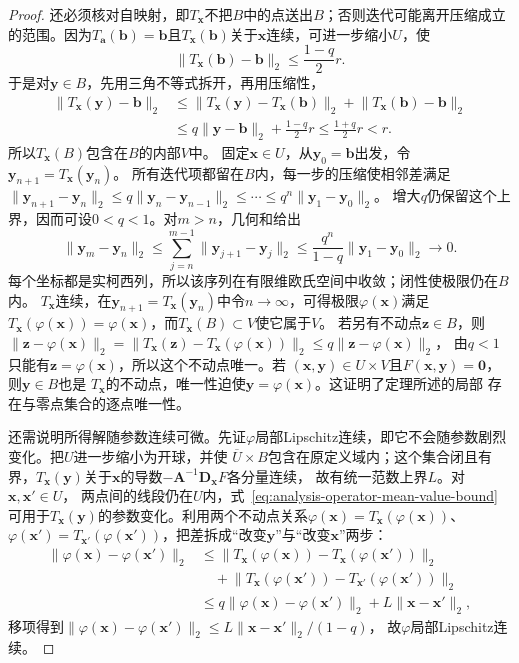 \begin{proof}
还必须核对自映射，即$T_{\bm x}$不把$B$中的点送出$B$；否则迭代可能离开压缩成立的范围。因为$T_{\bm{a}}(\bm{b})=\bm{b}$且$T_{\bm{x}}(\bm{b})$关于$\bm{x}$连续，可进一步缩小$U$，使
\[
 \lVert T_{\bm{x}}(\bm{b})-\bm{b}\rVert_2\leq\frac{1-q}{2}r.
\]
于是对$\bm{y}\in B$，先用三角不等式拆开，再用压缩性，
\[
 \begin{aligned}
  \lVert T_{\bm{x}}(\bm{y})-\bm{b}\rVert_2
  &\leq
  \lVert T_{\bm{x}}(\bm{y})-T_{\bm{x}}(\bm{b})\rVert_2+\lVert T_{\bm{x}}(\bm{b})-\bm{b}\rVert_2\\
  &\leq
  q\lVert\bm{y}-\bm{b}\rVert_2+\frac{1-q}{2}r
  \leq
  \frac{1+q}{2}r
  <r.
 \end{aligned}
\]
所以$T_{\bm{x}}(B)$包含在$B$的内部$V$中。
固定$\bm x\in U$，从$\bm y_0=\bm b$出发，令$\bm y_{n+1}=T_{\bm x}(\bm y_n)$。
所有迭代项都留在$B$内，每一步的压缩使相邻差满足
$\lVert\bm y_{n+1}-\bm y_n\rVert_2\leq q\lVert\bm y_n-\bm y_{n-1}\rVert_2\leq\cdots\leq q^n\lVert\bm y_1-\bm y_0\rVert_2$。
增大$q$仍保留这个上界，因而可设$0<q<1$。对$m>n$，几何和给出
\[
 \lVert\bm y_m-\bm y_n\rVert_2
 \leq\sum_{j=n}^{m-1}\lVert\bm y_{j+1}-\bm y_j\rVert_2
 \leq\frac{q^n}{1-q}\lVert\bm y_1-\bm y_0\rVert_2\longrightarrow0.
\]
每个坐标都是实柯西列，所以该序列在有限维欧氏空间中收敛；闭性使极限仍在$B$内。
$T_{\bm x}$连续，在$\bm y_{n+1}=T_{\bm x}(\bm y_n)$中令$n\to\infty$，可得极限$\varphi(\bm x)$满足
$T_{\bm x}(\varphi(\bm x))=\varphi(\bm x)$，而$T_{\bm x}(B)\subset V$使它属于$V$。
若另有不动点$\bm z\in B$，则
$\lVert\bm z-\varphi(\bm x)\rVert_2=\lVert T_{\bm x}(\bm z)-T_{\bm x}(\varphi(\bm x))\rVert_2\leq q\lVert\bm z-\varphi(\bm x)\rVert_2$，
由$q<1$只能有$\bm z=\varphi(\bm x)$，所以这个不动点唯一。若
$(\bm{x},\bm{y})\in U\times V$且$F(\bm{x},\bm{y})=\bm{0}$，则$\bm{y}\in B$也是
$T_{\bm{x}}$的不动点，唯一性迫使$\bm{y}=\varphi(\bm{x})$。这证明了定理所述的局部
存在与零点集合的逐点唯一性。

还需说明所得解随参数连续可微。先证$\varphi$局部Lipschitz连续，即它不会随参数剧烈变化。把$U$进一步缩小为开球，并使
$\overline U\times B$包含在原定义域内；这个集合闭且有界，$T_{\bm x}(\bm y)$关于$\bm x$的导数$-\bm A^{-1}\bm D_{\bm x}F$各分量连续，
故有统一范数上界$L$。对$\bm x,\bm x'\in U$，
两点间的线段仍在$U$内，式~\eqref{eq:analysis-operator-mean-value-bound}
可用于$T_{\bm x}(\bm y)$的参数变化。利用两个不动点关系$\varphi(\bm x)=T_{\bm x}(\varphi(\bm x))$、$\varphi(\bm x')=T_{\bm x'}(\varphi(\bm x'))$，把差拆成“改变$\bm y$”与“改变$\bm x$”两步：
\[
 \begin{aligned}
 \lVert\varphi(\bm{x})-\varphi(\bm{x}')\rVert_2
 &\leq\lVert T_{\bm x}(\varphi(\bm x))-T_{\bm x}(\varphi(\bm x'))\rVert_2\\
 &\quad+\lVert T_{\bm x}(\varphi(\bm x'))-T_{\bm x'}(\varphi(\bm x'))\rVert_2\\
 &\leq q\lVert\varphi(\bm{x})-\varphi(\bm{x}')\rVert_2+L\lVert\bm{x}-\bm{x}'\rVert_2,
 \end{aligned}
\]
移项得到$\lVert\varphi(\bm x)-\varphi(\bm x')\rVert_2
\leq L\lVert\bm x-\bm x'\rVert_2/(1-q)$，
故$\varphi$局部Lipschitz连续。


\end{proof}
